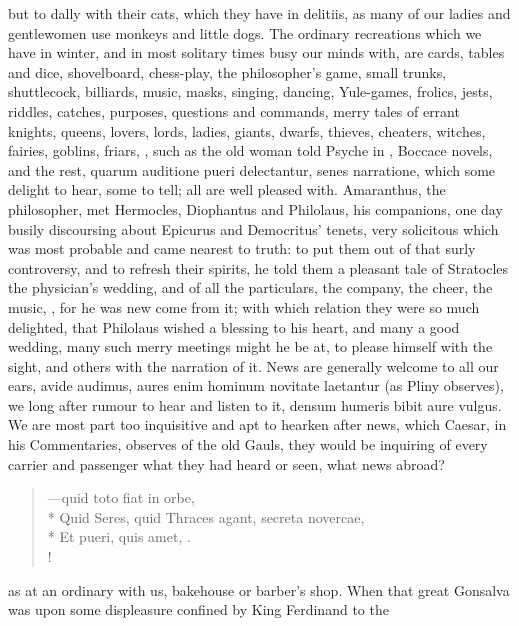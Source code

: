 {but to dally with their cats, which they have in delitiis, as many of
our ladies and gentlewomen use monkeys and little dogs. The ordinary
recreations which we have in winter, and in most solitary times busy
our minds with, are cards, tables and dice, shovelboard, chess-play,
the philosopher's game, small trunks, shuttlecock, billiards, music,
masks, singing, dancing, Yule-games, frolics, jests, riddles, catches,
purposes, questions and commands, merry tales of errant knights,
queens, lovers, lords, ladies, giants, dwarfs, thieves, cheaters,
witches, fairies, goblins, friars, \etc{}, such as the old woman told
Psyche in \Apuleius, Boccace novels, and the rest, quarum
auditione pueri delectantur, senes narratione, which some delight to
hear, some to tell; all are well pleased with. Amaranthus, the
philosopher, met Hermocles, Diophantus and Philolaus, his companions,
one day busily discoursing about Epicurus and Democritus' tenets, very
solicitous which was most probable and came nearest to truth: to put
them out of that surly controversy, and to refresh their spirits, he
told them a pleasant tale of Stratocles the physician's wedding, and of
all the particulars, the company, the cheer, the music, \etc{}, for he was
new come from it; with which relation they were so much delighted, that
Philolaus wished a blessing to his heart, and many a good
wedding, many such merry meetings might he be at, to please
himself with the sight, and others with the narration of it. News are
generally welcome to all our ears, avide audimus, aures enim hominum
novitate laetantur (as Pliny observes), we long after rumour to
hear and listen to it, densum humeris bibit aure vulgus. We are
most part too inquisitive and apt to hearken after news, which Caesar,
in his Commentaries, observes of the old Gauls, they would be
inquiring of every carrier and passenger what they had heard or seen,
what news abroad?
%
\begin{latin}%
\begin{verse}%
---quid toto fiat in orbe,\\*
Quid Seres, quid Thraces agant, secreta novercae,\\*
Et pueri, quis amet, \etc{}.\\!
\end{verse}%
\end{latin}%
%
as at an ordinary with us, bakehouse or barber's shop. When that great
Gonsalva was upon some displeasure confined by King Ferdinand to the
}
